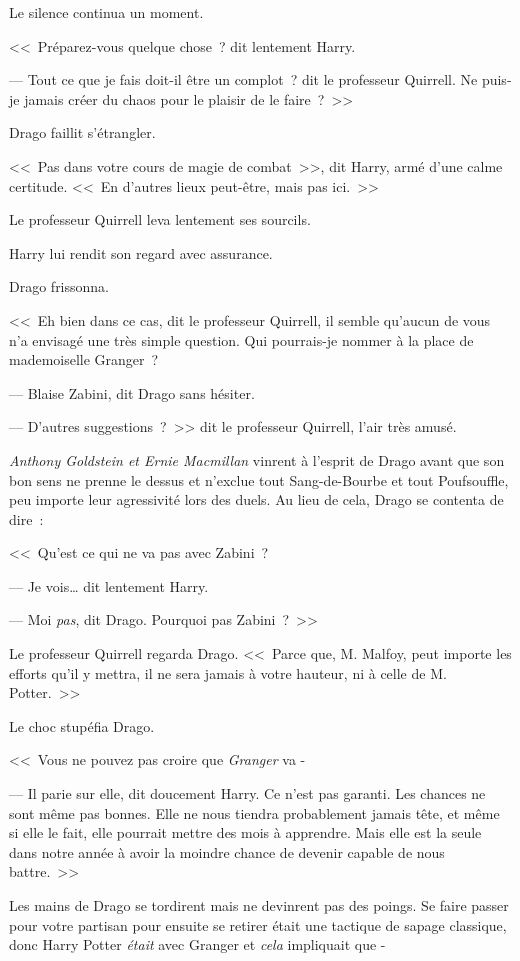 Le silence continua un moment.

<<~Préparez-vous quelque chose~? dit lentement Harry.

--- Tout ce que je fais doit-il être un complot~? dit le professeur Quirrell. Ne puis-je jamais créer du chaos pour le plaisir de le faire~?~>>

Drago faillit s'étrangler.

<<~Pas dans votre cours de magie de combat~>>, dit Harry, armé d'une calme certitude. <<~En d'autres lieux peut-être, mais pas ici.~>>

Le professeur Quirrell leva lentement ses sourcils.

Harry lui rendit son regard avec assurance.

Drago frissonna.

<<~Eh bien dans ce cas, dit le professeur Quirrell, il semble qu'aucun de vous n'a envisagé une très simple question. Qui pourrais-je nommer à la place de mademoiselle Granger~?

--- Blaise Zabini, dit Drago sans hésiter.

--- D'autres suggestions~?~>> dit le professeur Quirrell, l'air très amusé.

\emph{Anthony Goldstein et Ernie Macmillan} vinrent à l'esprit de Drago avant que son bon sens ne prenne le dessus et n'exclue tout Sang-de-Bourbe et tout Poufsouffle, peu importe leur agressivité lors des duels. Au lieu de cela, Drago se contenta de dire~:

<<~Qu'est ce qui ne va pas avec Zabini~?

--- Je vois… dit lentement Harry.

--- Moi \emph{pas}, dit Drago. Pourquoi pas Zabini~?~>>

Le professeur Quirrell regarda Drago. <<~Parce que, M. Malfoy, peut importe les efforts qu'il y mettra, il ne sera jamais à votre hauteur, ni à celle de M. Potter.~>>

Le choc stupéfia Drago.

<<~Vous ne pouvez pas croire que \emph{Granger} va -

--- Il parie sur elle, dit doucement Harry. Ce n'est pas garanti. Les chances ne sont même pas bonnes. Elle ne nous tiendra probablement jamais tête, et même si elle le fait, elle pourrait mettre des mois à apprendre. Mais elle est la seule dans notre année à avoir la moindre chance de devenir capable de nous battre.~>>

Les mains de Drago se tordirent mais ne devinrent pas des poings. Se faire passer pour votre partisan pour ensuite se retirer était une tactique de sapage classique, donc Harry Potter \emph{était} avec Granger et \emph{cela} impliquait que -


